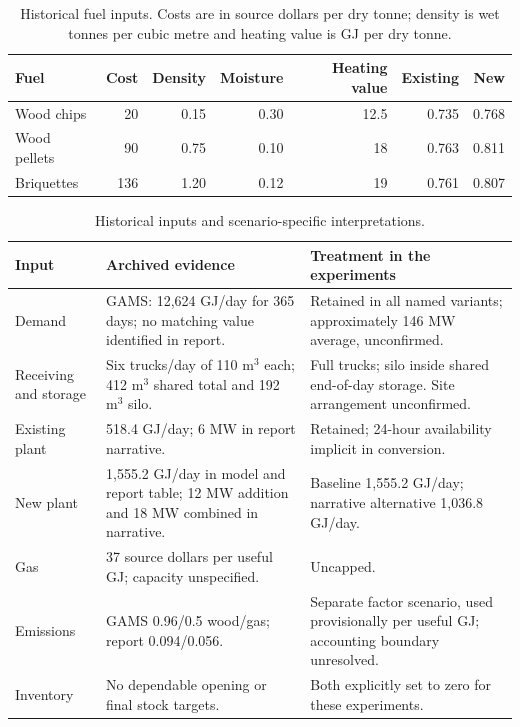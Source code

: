 \documentclass[11pt,a4paper]{article}
\begin{document}
\begin{table}[htbp]
\small
\caption{Historical fuel inputs. Costs are in source dollars per dry tonne;
density is wet tonnes per cubic metre and heating value is GJ per dry tonne.}
\label{tab:fuels}
\begin{tabularx}{\textwidth}{@{}Yrrrrrr@{}}
\toprule Fuel & Cost & Density & Moisture & Heating value & Existing & New\\ \midrule
Wood chips & 20 & 0.15 & 0.30 & 12.5 & 0.735 & 0.768\\
Wood pellets & 90 & 0.75 & 0.10 & 18 & 0.763 & 0.811\\
Briquettes & 136 & 1.20 & 0.12 & 19 & 0.761 & 0.807\\
\bottomrule
\end{tabularx}
\end{table}
\begin{table}[htbp]
\small
\caption{Historical inputs and scenario-specific interpretations.}
\label{tab:historical}
\begin{tabularx}{\textwidth}{@{}lYY@{}}
\toprule Input & Archived evidence & Treatment in the experiments\\ \midrule
Demand & GAMS: 12,624 GJ/day for 365 days; no matching value identified in report. &
Retained in all named variants; approximately 146 MW average, unconfirmed.\\
Receiving and storage & Six trucks/day of 110 \(\mathrm{m^3}\) each;
412 \(\mathrm{m^3}\) shared total and 192 \(\mathrm{m^3}\) silo. &
Full trucks; silo inside shared end-of-day storage. Site arrangement unconfirmed.\\
Existing plant & 518.4 GJ/day; 6 MW in report narrative. & Retained; 24-hour availability implicit in conversion.\\
New plant & 1,555.2 GJ/day in model and report table; 12 MW addition and 18 MW combined in narrative. &
Baseline 1,555.2 GJ/day; narrative alternative 1,036.8 GJ/day.\\
Gas & 37 source dollars per useful GJ; capacity unspecified. & Uncapped.\\
Emissions & GAMS 0.96/0.5 wood/gas; report 0.094/0.056. & Separate factor scenario,
used provisionally per useful GJ; accounting boundary unresolved.\\
Inventory & No dependable opening or final stock targets. & Both explicitly set to zero for these experiments.\\
\bottomrule
\end{tabularx}
\end{table}
\end{document}
